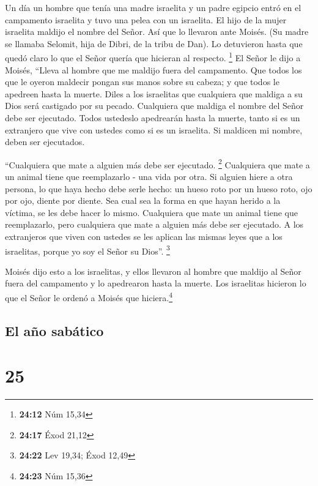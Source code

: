  Un día un hombre que tenía una madre israelita y un
padre egipcio entró en el campamento israelita y tuvo una pelea con un
israelita.  El hijo de la mujer israelita maldijo el
nombre del Señor. Así que lo llevaron ante Moisés. (Su madre se llamaba
Selomit, hija de Dibri, de la tribu de Dan).  Lo
detuvieron hasta que quedó claro lo que el Señor quería que hicieran al
respecto. \footnote{\textbf{24:12} Núm 15,34}  El Señor
le dijo a Moisés,  ``Lleva al hombre que me maldijo fuera
del campamento. Que todos los que le oyeron maldecir pongan sus manos
sobre su cabeza; y que todos le apedreen hasta la muerte.
 Diles a los israelitas que cualquiera que maldiga a su
Dios será castigado por su pecado.  Cualquiera que
maldiga el nombre del Señor debe ser ejecutado. Todos ustedeslo
apedrearán hasta la muerte, tanto si es un extranjero que vive con
ustedes como si es un israelita. Si maldicen mi nombre, deben ser
ejecutados.

 ``Cualquiera que mate a alguien más debe ser ejecutado.
\footnote{\textbf{24:17} Éxod 21,12}  Cualquiera que mate
a un animal tiene que reemplazarlo - una vida por otra. 
Si alguien hiere a otra persona, lo que haya hecho debe serle hecho:
 un hueso roto por un hueso roto, ojo por ojo, diente por
diente. Sea cual sea la forma en que hayan herido a la víctima, se les
debe hacer lo mismo.  Cualquiera que mate un animal tiene
que reemplazarlo, pero cualquiera que mate a alguien más debe ser
ejecutado.  A los extranjeros que viven con ustedes se
les aplican las mismas leyes que a los israelitas, porque yo soy el
Señor su Dios''. \footnote{\textbf{24:22} Lev 19,34; Éxod 12,49}

 Moisés dijo esto a los israelitas, y ellos llevaron al
hombre que maldijo al Señor fuera del campamento y lo apedrearon hasta
la muerte. Los israelitas hicieron lo que el Señor le ordenó a Moisés
que hiciera.\footnote{\textbf{24:23} Núm 15,36}

\hypertarget{el-auxf1o-sabuxe1tico}{%
\subsection{El año sabático}\label{el-auxf1o-sabuxe1tico}}

\hypertarget{section-24}{%
\section{25}\label{section-24}}

